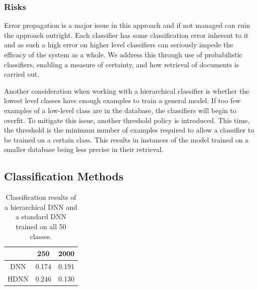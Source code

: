 \subsubsection{Risks}
Error propagation is a major issue in this approach and if not managed can ruin the approach outright. Each classifier has some classification error inherent to it and as such a high error on higher level classifiers can seriously impede the efficacy of the system as a whole. We address this through use of probabilistic classifiers, enabling a measure of certainty, and how retrieval of documents is carried out.

Another consideration when working with a hierarchical classifier is whether the lowest level classes have enough examples to train a general model. If too few examples of a low-level class are in the database, the classifiers will begin to overfit. To mitigate this issue, another threshold policy is introduced. This time, the threshold is the minimum number of examples required to allow a classifier to be trained on a certain class. This results in instances of the model trained on a smaller database being less precise in their retrieval.

\subsection{Classification Methods}

\begin{table}[t]
    \centering
    \begin{tabular}{ccc}
         & 250   & 2000  \\ \hline
    DNN  & 0.174 & 0.191 \\
    HDNN & 0.246 & 0.130
    \end{tabular}
    \caption{Classification results of a hierarchical DNN and a standard DNN trained on all 50 classes.}
    \label{tab:classifier}
\end{table}

